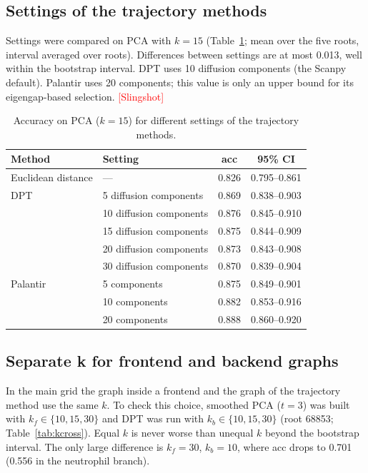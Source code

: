 \documentclass[12pt,a4paper]{article}
\newcommand{\todo}[1]{\textcolor{red}{[#1]}}
\begin{document}
\subsection{Settings of the trajectory methods}
Settings were compared on PCA with $k=15$ (Table~\ref{tab:settings}; mean over the five roots,
interval averaged over roots). Differences between settings are at most 0.013, well within the
bootstrap interval. DPT uses 10 diffusion components (the Scanpy default). Palantir uses 20
components; this value is only an upper bound for its eigengap-based selection.
\todo{Slingshot}

\begin{table}[ht]
\centering\small
\caption{Accuracy on PCA ($k=15$) for different settings of the trajectory methods.}
\label{tab:settings}
\begin{tabular}{llcc}
\toprule
Method & Setting & acc & 95\% CI \\
\midrule
Euclidean distance & --- & 0.826 & 0.795--0.861 \\
\midrule
DPT & 5 diffusion components  & 0.869 & 0.838--0.903 \\
    & 10 diffusion components & 0.876 & 0.845--0.910 \\
    & 15 diffusion components & 0.875 & 0.844--0.909 \\
    & 20 diffusion components & 0.873 & 0.843--0.908 \\
    & 30 diffusion components & 0.870 & 0.839--0.904 \\
\midrule
Palantir & 5 components  & 0.875 & 0.849--0.901 \\
         & 10 components & 0.882 & 0.853--0.916 \\
         & 20 components & 0.888 & 0.860--0.920 \\
\bottomrule
\end{tabular}
\end{table}

\subsection{Separate k for frontend and backend graphs}
In the main grid the graph inside a frontend and the graph of the trajectory method use the same
$k$. To check this choice, smoothed PCA ($t=3$) was built with $k_f \in \{10, 15, 30\}$ and DPT
was run with $k_b \in \{10, 15, 30\}$ (root 68853; Table~\ref{tab:kcross}). Equal $k$ is never
worse than unequal $k$ beyond the bootstrap interval. The only large difference is $k_f=30$,
$k_b=10$, where acc drops to 0.701 (0.556 in the neutrophil branch).
\end{document}
